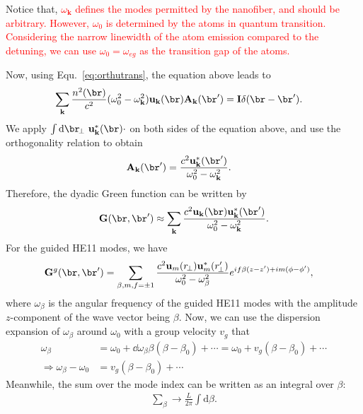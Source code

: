 \documentclass[]{report}
\begin{document}
Notice that, \textcolor{red}{$ \omega_{\mathbf{k}} $ defines the modes permitted by the nanofiber, and should be arbitrary. However, $ \omega_0 $ is determined by the atoms in quantum transition. Considering the narrow linewidth of the atom emission compared to the detuning, we can use $ \omega_0=\omega_{eg} $ as the transition gap of the atoms. }

Now, using Equ.~\eqref{eq:orthutrans}, the equation above leads to
\begin{align}
\sum_{\mathbf{k}} \frac{n^2(\br)}{c^2}(\omega_0^2-\omega_{\mathbf{k}}^2) \mathbf{u}_{\mathbf{k}}(\br) \mathbf{A}_{\mathbf{k}}(\br') &= \mathbf{I}\delta(\br-\br').
\end{align}
We apply $ \int \mathrm{d}\br_{\!\perp} \,\,\mathbf{u}^*_{\mathbf{k}}(\br)\cdot $ on both sides of the equation above, and use the orthogonality relation to obtain
\begin{align}
\mathbf{A}_{\mathbf{k}}(\br')&=\frac{c^2\mathbf{u}^*_{\mathbf{k}}(\br')}{\omega_0^2-\omega_{\mathbf{k}}^2}.
\end{align}
Therefore, the dyadic Green function can be written by 
\begin{align}
\mathbf{G}(\br,\br')\approx \sum_{\mathbf{k}} \frac{c^2\mathbf{u}_{\mathbf{k}}(\br)\mathbf{u}^*_{\mathbf{k}}(\br')}{\omega_0^2-\omega_{\mathbf{k}}^2}.
\end{align}
For the guided HE11 modes, we have 
\begin{align}
\mathbf{G}^g(\br,\br') &= \sum_{\beta,m,f=\pm 1} \frac{c^2\mathbf{u}_{m}(r\!_\perp)\mathbf{u}^*_{m}(r_{\!\perp}^\prime)}{\omega_0^2-\omega_\beta^2}e^{if\beta(z-z')+im(\phi-\phi')},\label{eq:Gganaly}
\end{align}
where $ \omega_\beta $ is the angular frequency of the guided HE11 modes with the amplitude $ z $-component of the wave vector being $ \beta $. Now, we can use the dispersion expansion of $ \omega_\beta $ around $ \omega_0 $ with a group velocity $ v_g $ that 
\begin{align}
\omega_\beta &=\omega_0 + \dd{\omega_\beta}{\beta}(\beta-\beta_0) +\cdots = \omega_0 + v_g(\beta-\beta_0) +\cdots\\
\Rightarrow \omega_\beta - \omega_0 &= v_g(\beta-\beta_0) +\cdots
\end{align}
Meanwhile, the sum over the mode index can be written as an integral over $ \beta $:
\begin{align}
\sum_{\beta} \rightarrow \frac{L}{2\pi}\int \mathrm{d}\beta.
\end{align}
\end{document}
